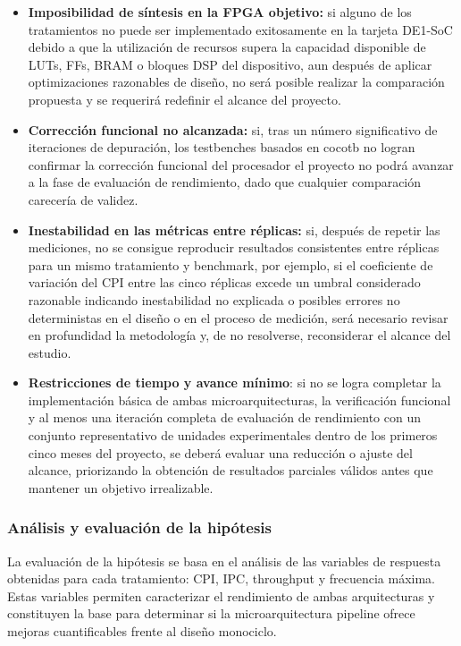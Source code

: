 \begin{itemize}
    \item \textbf{Imposibilidad de síntesis en la FPGA objetivo:} si alguno de los tratamientos no puede ser implementado exitosamente en la tarjeta DE1-SoC debido a que la utilización de recursos supera la capacidad disponible de LUTs, FFs, BRAM o bloques DSP del dispositivo, aun después de aplicar optimizaciones razonables de diseño, no será posible realizar la comparación propuesta y se requerirá redefinir el alcance del proyecto.

    \item \textbf{Corrección funcional no alcanzada:} si, tras un número significativo de iteraciones de depuración, los testbenches basados en cocotb no logran confirmar la corrección funcional del procesador el proyecto no podrá avanzar a la fase de evaluación de rendimiento, dado que cualquier comparación carecería de validez.

    \item \textbf{Inestabilidad en las métricas entre réplicas:} si, después de repetir las mediciones, no se consigue reproducir resultados consistentes entre réplicas para un mismo tratamiento y benchmark, por ejemplo, si el coeficiente de variación del CPI entre las cinco réplicas excede un umbral considerado razonable indicando inestabilidad no explicada o posibles errores no deterministas en el diseño o en el proceso de medición, será necesario revisar en profundidad la metodología y, de no resolverse, reconsiderar el alcance del estudio.

    \item \textbf{Restricciones de tiempo y avance mínimo}: si no se logra completar la implementación básica de ambas microarquitecturas, la verificación funcional y al menos una iteración completa de evaluación de rendimiento con un conjunto representativo de unidades experimentales dentro de los primeros cinco meses del proyecto, se deberá evaluar una reducción o ajuste del alcance, priorizando la obtención de resultados parciales válidos antes que mantener un objetivo irrealizable.
\end{itemize}

\subsubsection{Análisis y evaluación de la hipótesis}

La evaluación de la hipótesis se basa en el análisis de las variables de respuesta obtenidas para cada tratamiento: CPI, IPC, throughput y frecuencia máxima. Estas variables permiten caracterizar el rendimiento de ambas arquitecturas y constituyen la base para determinar si la microarquitectura pipeline ofrece mejoras cuantificables frente al diseño monociclo.

